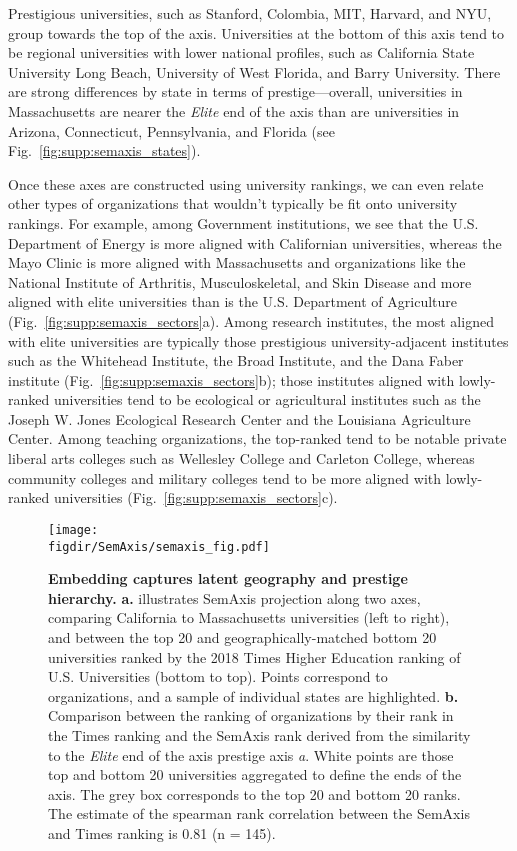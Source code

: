 \documentclass[12pt]{article} %
\def\figdir{../Figs}
\begin{document}
Prestigious universities, such as Stanford, Colombia, MIT, Harvard, and NYU, group towards the top of the axis.
Universities at the bottom of this axis tend to be regional universities with lower national profiles, such as California State University Long Beach, University of West Florida, and Barry University. 
There are strong differences by state in terms of prestige---overall, universities in Massachusetts are nearer the \textit{Elite} end of the axis than are universities in Arizona, Connecticut, Pennsylvania, and Florida (see Fig.~\ref{fig:supp:semaxis_states}). 

Once these axes are constructed using university rankings, we can even relate other types of organizations that wouldn't typically be fit onto university rankings.
For example, among Government institutions, we see that the U.S. Department of Energy is more aligned with Californian universities, whereas the Mayo Clinic is more aligned with Massachusetts and organizations like the National Institute of Arthritis, Musculoskeletal, and Skin Disease and more aligned with elite universities than is the U.S. Department of Agriculture (Fig.~\ref{fig:supp:semaxis_sectors}a).
Among research institutes, the most aligned with elite universities are typically those prestigious university-adjacent institutes such as the Whitehead Institute, the Broad Institute, and the Dana Faber institute (Fig.~\ref{fig:supp:semaxis_sectors}b); those institutes aligned with lowly-ranked universities tend to be ecological or agricultural institutes such as the Joseph W. Jones Ecological Research Center and the Louisiana Agriculture Center. 
Among teaching organizations, the top-ranked tend to be notable private liberal arts colleges such as Wellesley College and Carleton College, whereas community colleges and military colleges tend to be more aligned with lowly-ranked universities (Fig.~\ref{fig:supp:semaxis_sectors}c). 

%
%
\begin{figure}[hp!]
	\centering
	\texttt{[image: \\figdir/SemAxis/semaxis\_fig.pdf]}
	\caption{
		\textbf{Embedding captures latent geography and prestige hierarchy.}
		\textbf{a.} illustrates SemAxis projection along two axes, comparing California to Massachusetts universities (left to right), and between the top 20 and geographically-matched bottom 20 universities ranked by the 2018 Times Higher Education ranking of U.S. Universities (bottom to top). 
		Points correspond to organizations, and a sample of individual states are highlighted. 
		\textbf{b.} Comparison between the ranking of organizations by their rank in the Times ranking and the SemAxis rank derived from the similarity to the \textit{Elite} end of the axis prestige axis \textit{a}.
		White points are those top and bottom 20 universities aggregated to define the ends of the axis. 
		The grey box corresponds to the top 20 and bottom 20 ranks. 
	  	The estimate of the spearman rank correlation between the SemAxis and Times ranking is 0.81 (n = 145).
	}
	\label{fig:semaxis}
\end{figure}
\end{document}
